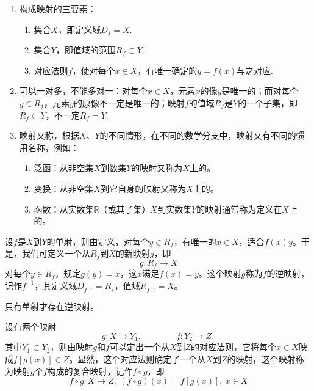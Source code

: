 \documentclass[lang=cn,10pt]{elegantbook}
\newcommand{\R}{\mathbb{R}}
\begin{document}
\begin{note}
	\begin{enumerate}
		\item 构成映射的{\heiti 三要素}：
		\begin{enumerate}
			\item 集合\( X \)，即{\heiti 定义域}\( D_{f} = X \).
			\item 集合\( Y \)，即{\heiti 值域}的范围\( R_{f} \subset Y \).
			\item {\heiti 对应法则\( f \)}，使对每个\( x \in X \)，有唯一确定的\( y = f(x) \)与之对应.
		\end{enumerate}
		\item 可以一对多，不能多对一：对每个\( x \in X \)，元素\( x \)的像\( y \)是唯一的；而对每个\( y \in R_{f} \)，元素\( y \)的原像不一定是唯一的；映射\( f \)的值域\( R_{f} \)是\( Y \)的一个子集，即\( R_{f} \subset Y \)，不一定\( R_{f} = Y \).
		\item 映射又称，根据\( X \)、\( Y \)的不同情形，在不同的数学分支中，映射又有不同的惯用名称，例如：
		\begin{enumerate}
			\item {\heiti 泛函}：从非空集\( X \)到数集\( Y \)的映射又称为\( X \)上的。
			\item {\heiti 变换}：从非空集\( X \)到它自身的映射又称为\( X \)上的。
			\item {\heiti 函数}：从实数集\( \R \)（或其子集）\( X \)到实数集\( Y \)的映射通常称为定义在\( X \)上的。
		\end{enumerate}
	\end{enumerate}
\end{note}

\begin{definition}[逆映射]
	设\( f \)是\( X \)到\( Y \)的单射，则由定义，对每个\( y \in R_{f} \)，有唯一的\( x \in X \)，适合\( f(x) y \)。于是，我们可定义一个从\( R_{f} \)到\( X \)的新映射\( g \)，即
	\[ g: R_{f} \rightarrow X \]
	对每个\( y \in R_{f} \)，规定\( g(y) = x \)，这\( x \)满足\( f(x) = y \)。这个映射\( g \)称为\( f \)的逆映射，记作\( f^{-1} \)，其定义域\( D_{f^{-1}} = R_{f} \)，值域\( R_{f^{-1}} = X \)。
\end{definition}

\begin{note}
	只有单射才存在逆映射。
\end{note}

\begin{definition}[复合映射]
	设有两个映射
	\[ g:X \rightarrow Y_{1}, \qquad\qquad f:Y_{2} \rightarrow Z, \]
	其中\( Y_{1} \subset Y_{2} \)，则由映射\( g \)和\( f \)可以定出一个从\( X \)到\( Z \)的对应法则，它将每个\( x \in X \)映成\( f[g(x)] \in Z \)。显然，这个对应法则确定了一个从\( X \)到\( Z \)的映射，这个映射称为映射\( g \)个\( f \)构成的{\heiti 复合映射}，记作\( f \circ g \)，即
	\[ f \circ g: X \rightarrow Z,\ (f \circ g)(x) = f[g(x)],\ x \in X \]
\end{definition}
\end{document}
